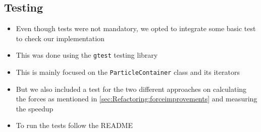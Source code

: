 \documentclass{article}
\begin{document}
\subsection{Testing}

\begin{itemize}
    \item Even though tests were not mandatory, we opted to integrate some basic test to check our implementation
    \item This was done using the \verb|gtest| testing library
    \item This is mainly focused on the \verb|ParticleContainer| class and its iterators
    \item But we also included a test for the two different approaches on calculating the forces as mentioned in \ref{sec:Refactoring:forceimprovements} and measuring the speedup
    \item To run the tests follow the README
\end{itemize}
\end{document}
